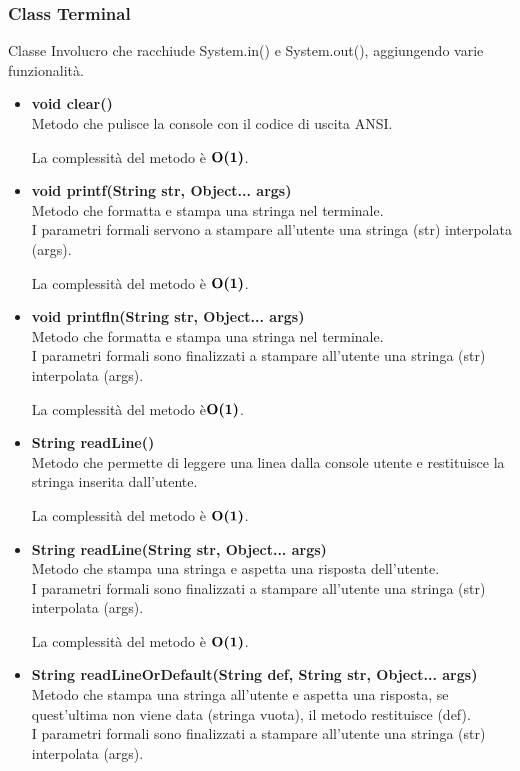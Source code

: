 \documentclass[a4paper, 12pt]{scrreprt}
\begin{document}
				\subsubsection{Class Terminal}
				Classe Involucro che racchiude System.in() e System.out(), aggiungendo varie funzionalit\`a.
				\begin{itemize}
					\item \textbf{void clear()}
					\\Metodo che pulisce la console con il codice di uscita ANSI.

					La complessit\`a del metodo \`e $\mathbf{O}\textbf{(1)}$.

					\item \textbf{void printf(String str, Object... args)}
					\\Metodo che formatta e stampa una stringa nel terminale.
					\\I parametri formali servono a stampare all'utente una stringa (str) interpolata (args).

					La complessit\`a del metodo \`e $\mathbf{O}\textbf{(1)}$.

					\item \textbf{void printfln(String str, Object... args)}
					\\Metodo che formatta e stampa una stringa nel terminale.
					\\I parametri formali sono finalizzati a stampare all'utente una stringa (str) interpolata (args).

					La complessit\`a del metodo \`e$\mathbf{O}\textbf{(1)}$.

					\item \textbf{String readLine()}
					\\Metodo che permette di leggere una linea dalla console utente e restituisce la stringa inserita dall'utente.

					La complessit\`a del metodo \`e $\mathbf{O}\textbf{(1)}$.

					\item \textbf{String readLine(String str, Object... args)}
					\\Metodo che stampa una stringa e aspetta una risposta dell'utente.
					\\I parametri formali sono finalizzati a stampare all'utente una stringa (str) interpolata (args).

					La complessit\`a del metodo \`e $\mathbf{O}\textbf{(1)}$.

					\item \textbf{String readLineOrDefault(String def, String str, Object... args)}
					\\Metodo che stampa una stringa all'utente e aspetta una risposta, se quest'ultima non viene data (stringa vuota), il metodo restituisce (def).
					\\I parametri formali sono finalizzati a stampare all'utente una stringa (str) interpolata (args).


\end{itemize}
\end{document}
